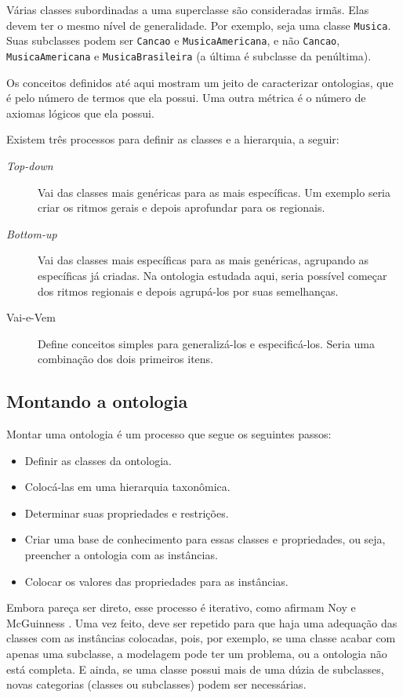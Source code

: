 Várias classes subordinadas a uma superclasse são consideradas irmãs. Elas devem ter o mesmo nível de generalidade. Por exemplo, seja uma classe \texttt{Musica}. Suas subclasses podem ser \texttt{Cancao} e \texttt{MusicaAmericana}, e não \texttt{Cancao}, \texttt{MusicaAmericana} e \texttt{MusicaBrasileira} (a última é subclasse da penúltima).

Os conceitos definidos até aqui mostram um jeito de caracterizar ontologias, que é pelo número de termos que ela possui. Uma outra métrica é o número de axiomas lógicos que ela possui. 

Existem três processos para definir as classes e a hierarquia, a seguir:

\begin{description}
	\item[\textit{Top-down}] Vai das classes mais genéricas para as mais específicas. Um exemplo seria criar os ritmos gerais e depois aprofundar para os regionais.
	\item[\textit{Bottom-up}] Vai das classes mais específicas para as mais genéricas, agrupando as específicas já criadas. Na ontologia estudada aqui, seria possível começar dos ritmos regionais e depois agrupá-los por suas semelhanças.
	\item[Vai-e-Vem] Define conceitos simples para generalizá-los e especificá-los. Seria uma com\-bi\-na\-ção dos dois primeiros itens.
\end{description}

\subsection{Montando a ontologia}

Montar uma ontologia é um processo que segue os seguintes passos:

\begin{itemize}
	\item Definir as classes da ontologia.
	\item Colocá-las em uma hierarquia taxonômica.
	\item Determinar suas propriedades e restrições.
	\item Criar uma base de conhecimento para essas classes e propriedades, ou seja, preencher a ontologia com as instâncias.
	\item Colocar os valores das propriedades para as instâncias.
\end{itemize}

Embora pareça ser direto, esse processo é iterativo, como afirmam Noy e McGuinness  \citep{ontoNoy}. Uma vez feito, deve ser repetido para que haja uma adequação das classes com as instâncias colocadas, pois, por exemplo, se uma classe acabar com apenas uma subclasse, a modelagem pode ter um problema, ou a ontologia não está completa. E ainda, se uma classe possui mais de uma dúzia de subclasses, novas categorias (classes ou subclasses) podem ser necessárias. 

